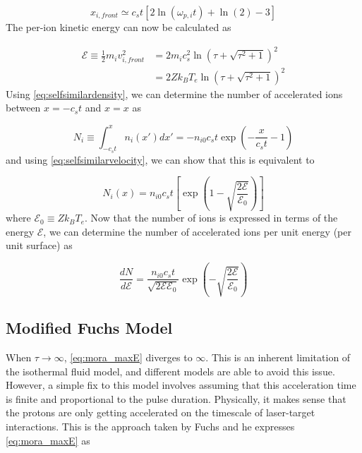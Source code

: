 \begin{equation}
	x_{i, front} \simeq c_s t [2 \ln(\omega_{p,i} t) + \ln(2) - 3] \label{eq:mora_xfront_simple}
\end{equation}
The per-ion kinetic energy can now be calculated as

\begin{align}
	\mathcal{E} \equiv \frac{1}{2} m_i v_{i,front}^2 &= 2 m_i c_s^2 \ln(\tau + \sqrt{\tau^2 + 1})^2  \nonumber\\
	&= 2 Z k_B T_{e} \ln(\tau + \sqrt{\tau^2 + 1})^2 \label{eq:mora_maxE}
\end{align}
Using \cref{eq:selfsimilardensity}, we can determine the number of accelerated ions between $x = -c_s t$ and $x = x$ as

\begin{equation}
	N_i \equiv \int_{-c_s t}^{x} n_i(x') dx' = -n_{i0} c_s t \exp(-\frac{x}{c_s t} - 1)
\end{equation}
and using \cref{eq:selfsimilarvelocity}, we can show that this is equivalent to 

\begin{equation}
	N_i(x) = n_{i0} c_s t [\exp(1-\sqrt{\frac{2 \mathcal{E}}{\mathcal{E}_0}})] \label{eq:numprotons}
\end{equation}
where $\mathcal{E}_0 \equiv Z k_B T_e$. Now that the number of ions is expressed in terms of the energy $\mathcal{E}$, we can determine the number of accelerated ions per unit energy (per unit surface) as 

\begin{equation}
	\frac{d N}{d \mathcal{E}} = \frac{n_{i0} c_s t}{\sqrt{2 \mathcal{E} \mathcal{E}_0}} \exp(-\sqrt{\frac{2 \mathcal{E}}{\mathcal{E}_0}}) \label{eq:dNdE}
\end{equation}
	
\subsection{Modified Fuchs Model} \label{sec:fuchsv1}

When $\tau \rightarrow \infty$, \cref{eq:mora_maxE} diverges to $\infty$. This is an inherent limitation of the isothermal fluid model, and different models are able to avoid this issue\cite{Mora_2005_PRE,Passoni_2010_NJoP,Schreiber_2006_PRL}. However, a simple fix to this model involves assuming that this acceleration time is finite and proportional to the pulse duration. Physically, it makes sense that the protons are only getting accelerated on the timescale of  laser-target interactions. This is the approach taken by Fuchs\cite{Fuchs_2005_Nat} and he expresses \cref{eq:mora_maxE} as 

